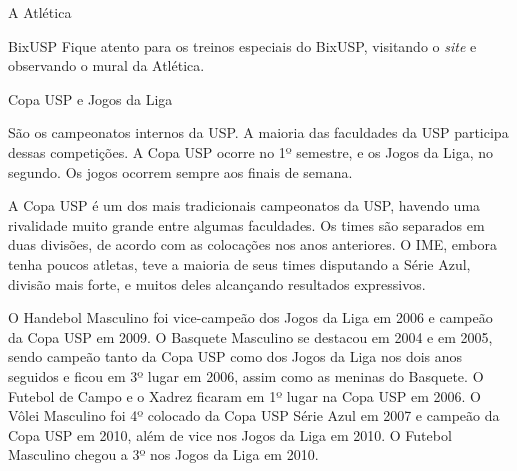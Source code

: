 \begin{secao}{A Atlética}
\begin{subsecao}{BixUSP}
Fique atento para os treinos especiais do BixUSP, visitando o \textit{site} e observando 
o mural da Atlética.

\end{subsecao}
\begin{subsecao}{Copa USP e Jogos da Liga}

São os campeonatos internos da USP. A maioria das faculdades da USP participa
dessas competições. A Copa USP ocorre no 1º semestre, e os Jogos da Liga,
no segundo. Os jogos ocorrem sempre aos finais de semana.

A Copa USP é um dos mais tradicionais campeonatos da USP, havendo uma
rivalidade muito grande entre algumas faculdades. Os times são separados em
duas divisões, de acordo com as colocações nos anos anteriores. O IME, embora
tenha poucos atletas, teve a maioria de seus times disputando a Série Azul,
divisão mais forte, e muitos deles alcançando resultados expressivos.

%	  


O Handebol Masculino foi vice-campeão dos Jogos da Liga em 2006 e campeão da
Copa USP em 2009. O Basquete Masculino se destacou em 2004 e em 2005, sendo
campeão tanto da Copa USP como dos Jogos da Liga nos dois anos seguidos e ficou
em 3º lugar em 2006, assim como as meninas do Basquete. O Futebol de
Campo e o Xadrez ficaram em 1º lugar na Copa USP em 2006. O Vôlei
Masculino foi 4º colocado da Copa USP Série Azul em 2007 e campeão da Copa
USP em 2010, além de vice nos Jogos da Liga em 2010. O Futebol Masculino chegou
a 3º nos Jogos da Liga em 2010.


\end{subsecao}
\end{secao}
